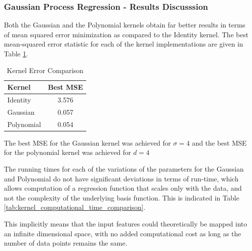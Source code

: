 \documentclass[parskip=full]{scrartcl}
\begin{document}

        \subsubsection*{Gaussian Process Regression - Results Discusssion} %
        \label{ssub:gaussian_process_regression_results_discusssion}

            Both the Gaussian and the Polynomial kernels obtain far better results in terms of mean squared error minimization as compared to the Identity kernel. The best mean-squared error statistic for each of the kernel implementations are given in Table \ref{tab:kernel_error_comparison}.

            \begin{table}[ht]
                \centering
                \begin{tabular}{| l | c |}
                \hline
                \textbf{Kernel} & \textbf{Best MSE} \\
                \hline
                \hline
                    Identity & 3.576 \\
                \hline
                    Gaussian & 0.057 \\
                \hline
                    Polynomial & 0.054 \\
                \hline
                \end{tabular}
                \caption{Kernel Error Comparison}
                \label{tab:kernel_error_comparison}
            \end{table}
            The best MSE for the Gaussian kernel was achieved for $\sigma = 4$ and the best MSE for the polynomial kernel was achieved for $d = 4$

            The running times for each of the variations of the parameters for the Gaussian and Polynomial do not have significant deviations in terms of run-time, which allows computation of a regression function that scales only with the data, and not the complexity of the underlying basis function. This is indicated in Table \ref{tab:kernel_computational_time_comparison}. 

            This implicitly means that the input features could theoretically be mapped into an infinite dimensional space, with no added computational cost as long as the number of data points remains the same.
            
\end{document}

